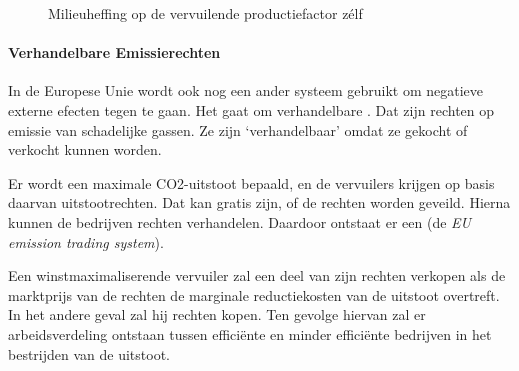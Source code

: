 \begin{figure}[H]
\centering
\captionsetup{justification=centering,margin=2cm}
\caption{Milieuheffing op de vervuilende productiefactor z\'elf}
\label{fig:h4-heff2}
\end{figure}

\paragraph{Verhandelbare Emissierechten}

In de Europese Unie wordt ook nog een ander systeem gebruikt om negatieve externe efecten tegen te gaan. Het gaat om verhandelbare . Dat zijn rechten op emissie van schadelijke gassen. Ze zijn `verhandelbaar' omdat ze gekocht of verkocht kunnen worden. \\

\par Er wordt een maximale CO2-uitstoot bepaald, en de vervuilers krijgen op basis daarvan uitstootrechten. Dat kan gratis zijn, of de rechten worden geveild. Hierna kunnen de bedrijven rechten verhandelen. Daardoor ontstaat er een  (de \textit{EU emission trading system}).\\

\par Een winstmaximaliserende vervuiler zal een deel van zijn rechten verkopen als de marktprijs van de rechten de marginale reductiekosten van de uitstoot overtreft. In het andere geval zal hij rechten kopen. Ten gevolge hiervan zal er arbeidsverdeling ontstaan tussen effici\"ente en minder effici\"ente bedrijven in het bestrijden van de uitstoot.\\

